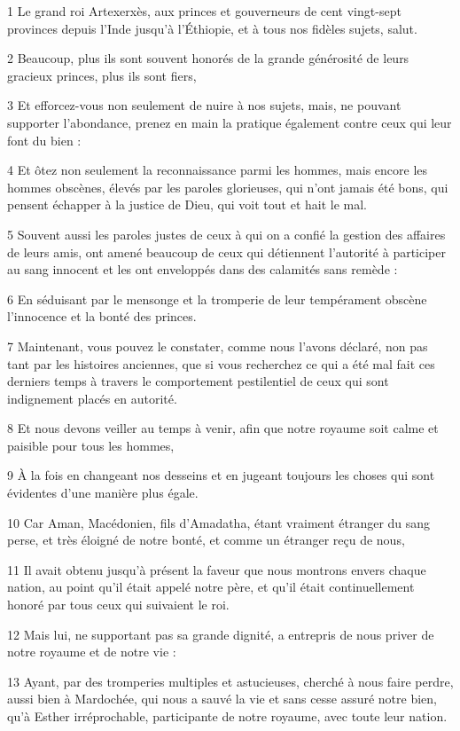 \par 1 Le grand roi Artexerxès, aux princes et gouverneurs de cent vingt-sept provinces depuis l'Inde jusqu'à l'Éthiopie, et à tous nos fidèles sujets, salut.
\par 2 Beaucoup, plus ils sont souvent honorés de la grande générosité de leurs gracieux princes, plus ils sont fiers,
\par 3 Et efforcez-vous non seulement de nuire à nos sujets, mais, ne pouvant supporter l'abondance, prenez en main la pratique également contre ceux qui leur font du bien :
\par 4 Et ôtez non seulement la reconnaissance parmi les hommes, mais encore les hommes obscènes, élevés par les paroles glorieuses, qui n'ont jamais été bons, qui pensent échapper à la justice de Dieu, qui voit tout et hait le mal.
\par 5 Souvent aussi les paroles justes de ceux à qui on a confié la gestion des affaires de leurs amis, ont amené beaucoup de ceux qui détiennent l'autorité à participer au sang innocent et les ont enveloppés dans des calamités sans remède :
\par 6 En séduisant par le mensonge et la tromperie de leur tempérament obscène l'innocence et la bonté des princes.
\par 7 Maintenant, vous pouvez le constater, comme nous l'avons déclaré, non pas tant par les histoires anciennes, que si vous recherchez ce qui a été mal fait ces derniers temps à travers le comportement pestilentiel de ceux qui sont indignement placés en autorité.
\par 8 Et nous devons veiller au temps à venir, afin que notre royaume soit calme et paisible pour tous les hommes,
\par 9 À la fois en changeant nos desseins et en jugeant toujours les choses qui sont évidentes d'une manière plus égale.
\par 10 Car Aman, Macédonien, fils d'Amadatha, étant vraiment étranger du sang perse, et très éloigné de notre bonté, et comme un étranger reçu de nous,
\par 11 Il avait obtenu jusqu'à présent la faveur que nous montrons envers chaque nation, au point qu'il était appelé notre père, et qu'il était continuellement honoré par tous ceux qui suivaient le roi.
\par 12 Mais lui, ne supportant pas sa grande dignité, a entrepris de nous priver de notre royaume et de notre vie :
\par 13 Ayant, par des tromperies multiples et astucieuses, cherché à nous faire perdre, aussi bien à Mardochée, qui nous a sauvé la vie et sans cesse assuré notre bien, qu'à Esther irréprochable, participante de notre royaume, avec toute leur nation.
